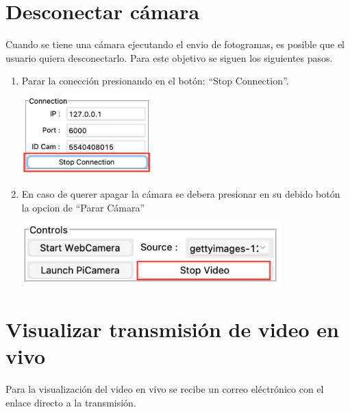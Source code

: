 \section*{Desconectar cámara}

Cuando se tiene una cámara ejecutando el envio de fotogramas, es posible que el usuario quiera desconectarlo. Para este objetivo se siguen los siguientes pasos.
\begin{enumerate}
    \item Parar la conección presionando en el botón: ``Stop Connection''.
    \begin{center}
        \includegraphics[width=5cm]{img/anexos/stop_connection.png}
    \end{center}
    \item En caso de querer apagar la cámara se debera presionar en su debido botón la opcion de ``Parar Cámara''
    \begin{center}
        \includegraphics[width=10cm]{img/anexos/stop_video.png}
    \end{center}
\end{enumerate}

\section*{Visualizar transmisión de video en vivo}
Para la visualización del video en vivo se recibe un correo eléctrónico con el enlace directo a la transmisión.

